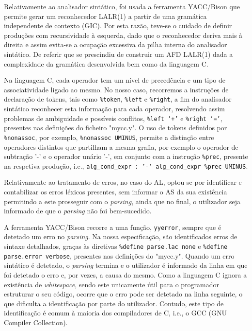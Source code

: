 \documentclass{report}
\begin{document}
Relativamente ao analisador sintático, foi usada a ferramenta YACC/Bison que permite gerar um reconhecedor LALR(1) a partir de uma gramática independente de contexto (GIC). Por esta razão, teve-se o cuidado de definir produções com recursividade à esquerda, dado que o reconhecedor deriva mais à direita e assim evita-se a ocupação excessiva da pilha interna do analisador sintático. De referir que se prescindiu de construir um AFD LALR(1) dada a complexidade da gramática desenvolvida bem como da linguagem C.

Na linguagem C, cada operador tem um nível de precedência e um tipo de associatividade ligado ao mesmo. No nosso caso, recorremos a instruções de declaração de tokens, tais como \texttt{\%token}, \texttt{\%left} e \texttt{\%right}, a fim do analisador sintático reconhecer esta informação para cada operador, resolvendo assim problemas de ambiguidade e possíveis conflitos, \texttt{\%left '+'} e \texttt{\%right '='}, presentes nas definições do ficheiro "mycc.y". O uso de tokens definidos por \texttt{\%nonassoc}, por exemplo, \texttt{\%nonassoc UMINUS}, permite a distinção entre operadores distintos que partilham a mesma grafia, por exemplo o operador de subtração '-' e o operador unário '-', em conjunto com a instrução \texttt{\%prec}, presente na respetiva produção, i.e., \texttt{alg\_cond\_expr : '-' alg\_cond\_expr \%prec UMINUS}.

Relativamente ao tratamento de erros, no caso do AL, optou-se por identificar e contabilizar os erros léxicos presentes, sem informar o AS da sua existência permitindo a este prosseguir com o \textit{parsing}, ainda que no final, o utilizador seja informado de que o \textit{parsing} não foi bem-sucedido.

A ferramenta YACC/Bison recorre a uma função, \texttt{yyerror}, sempre que é detetado um erro no  \textit{parsing}. Na nossa especificação, são identificados erros de sintaxe detalhados, graças às diretivas \texttt{\%define parse.lac none} e \texttt{\%define parse.error verbose}, presentes nas definições do "mycc.y".
Quando um erro sintático é detetado, o \textit{parsing} termina e o utilizador é informado da linha em que foi detetado o erro e, por vezes, a causa do mesmo.
Como a linguagem C ignora a existência de \textit{whitespace}, sendo este unicamente útil para o programador estruturar o seu código, ocorre que o erro pode ser detetado na linha seguinte, o que dificulta a identificação por parte do utilizador. Contudo, este tipo de identificação é comum à maioria dos compiladores de C, i.e., o GCC (GNU Compiler Collection).
\end{document}
